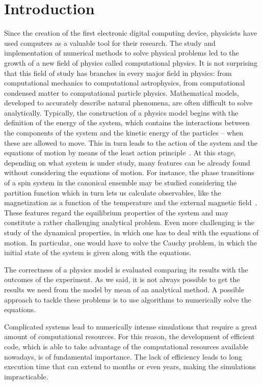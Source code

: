 \chapter{Introduction}
Since the creation of the first electronic digital computing device, physicists have used computers as a valuable tool for their research. The study and implementation of numerical methods to solve physical problems led to the growth of a new field of physics called computational physics. It is not surprising that this field of study has branches in every major field in physics: from computational mechanics to computational astrophysics, from computational condensed matter to computational particle physics. Mathematical models, developed to accurately describe natural phenomena, are often difficult to solve analytically. Typically, the construction of a physics model begins with the definition of the energy of the system, which contains the interactions between the components of the system and the kinetic energy of the particles -- when these are allowed to move. This in turn leads to the action of the system and the equations of motion by means of the least action principle~\citep{LL85}. At this stage, depending on what system is under study, many features can be already found without considering the equations of motion. For instance, the phase transitions of a spin system in the canonical ensemble may be studied considering the partition function which in turn lets us calculate observables, like the magnetization as a function of the temperature and the external magnetic field~\citep{Huang28}. These features regard the equilibrium properties of the system and may constitute a rather challenging analytical problem. Even more challenging is the study of the dynamical properties, in which one has to deal with the equations of motion. In particular, one would have to solve the Cauchy problem, in which the initial state of the system is given along with the equations.

The correctness of a physics model is evaluated comparing its results with the outcomes of the experiment. As we said, it is not always possible to get the results we need from the model by mean of an analytical method. A possible approach to tackle these problems is to use algorithms to numerically solve the equations.

Complicated systems lead to numerically intense simulations that require a great amount of computational resources. For this reason, the development of efficient code, which is able to take advantage of the computational resources available nowadays, is of fundamental importance. The lack of efficiency leads to long execution time that can extend to months or even years, making the simulations impracticable. 

